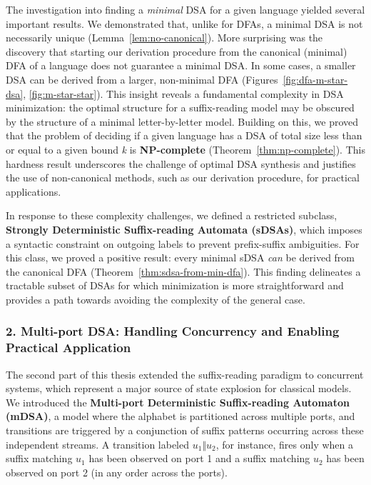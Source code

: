 The investigation into finding a \textit{minimal} DSA for a given language yielded several important results. We demonstrated that, unlike for DFAs, a minimal DSA is not necessarily unique (Lemma~\ref{lem:no-canonical}). More surprising was the discovery that starting our derivation procedure from the canonical (minimal) DFA of a language does not guarantee a minimal DSA. In some cases, a smaller DSA can be derived from a larger, non-minimal DFA (Figures~\ref{fig:dfa-m-star-dsa}, \ref{fig:m-star-star}). This insight reveals a fundamental complexity in DSA minimization: the optimal structure for a suffix-reading model may be obscured by the structure of a minimal letter-by-letter model. Building on this, we proved that the problem of deciding if a given language has a DSA of total size less than or equal to a given bound \textit{k} is \textbf{NP-complete} (Theorem~\ref{thm:np-complete}). This hardness result underscores the challenge of optimal DSA synthesis and justifies the use of non-canonical methods, such as our derivation procedure, for practical applications.

In response to these complexity challenges, we defined a restricted subclass, \textbf{Strongly Deterministic Suffix-reading Automata (sDSAs)}, which imposes a syntactic constraint on outgoing labels to prevent prefix-suffix ambiguities. For this class, we proved a positive result: every minimal sDSA \textit{can} be derived from the canonical DFA (Theorem~\ref{thm:sdsa-from-min-dfa}). This finding delineates a tractable subset of DSAs for which minimization is more straightforward and provides a path towards avoiding the complexity of the general case.

\subsubsection*{2. Multi-port DSA: Handling Concurrency and Enabling Practical Application}

The second part of this thesis extended the suffix-reading paradigm to concurrent systems, which represent a major source of state explosion for classical models. We introduced the \textbf{Multi-port Deterministic Suffix-reading Automaton (mDSA)}, a model where the alphabet is partitioned across multiple ports, and transitions are triggered by a conjunction of suffix patterns occurring across these independent streams. A transition labeled \(u_1 \Vert u_2\), for instance, fires only when a suffix matching \(u_1\) has been observed on port 1 and a suffix matching \(u_2\) has been observed on port 2 (in any order across the ports).

